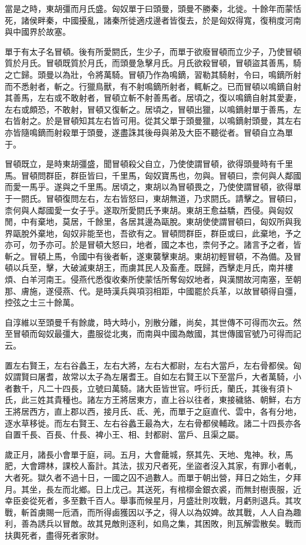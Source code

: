 當是之時，東胡彊而月氏盛。匈奴單于曰頭曼，頭曼不勝秦，北徙。十餘年而蒙恬死，諸侯畔秦，中國擾亂，諸秦所徙適戍邊者皆復去，於是匈奴得寬，復稍度河南與中國界於故塞。

單于有太子名冒頓。後有所愛閼氏，生少子，而單于欲廢冒頓而立少子，乃使冒頓質於月氏。冒頓既質於月氏，而頭曼急擊月氏。月氏欲殺冒頓，冒頓盜其善馬，騎之亡歸。頭曼以為壯，令將萬騎。冒頓乃作為鳴鏑，習勒其騎射，令曰，鳴鏑所射而不悉射者，斬之。行獵鳥獸，有不射鳴鏑所射者，輒斬之。已而冒頓以鳴鏑自射其善馬，左右或不敢射者，冒頓立斬不射善馬者。居頃之，復以鳴鏑自射其愛妻，左右或頗恐，不敢射，冒頓又復斬之。居頃之，冒頓出獵，以鳴鏑射單于善馬，左右皆射之。於是冒頓知其左右皆可用。從其父單于頭曼獵，以鳴鏑射頭曼，其左右亦皆隨鳴鏑而射殺單于頭曼，遂盡誅其後母與弟及大臣不聽從者。冒頓自立為單于。

冒頓既立，是時東胡彊盛，聞冒頓殺父自立，乃使使謂冒頓，欲得頭曼時有千里馬。冒頓問群臣，群臣皆曰，千里馬，匈奴寶馬也，勿與。冒頓曰，柰何與人鄰國而愛一馬乎。遂與之千里馬。居頃之，東胡以為冒頓畏之，乃使使謂冒頓，欲得單于一閼氏。冒頓復問左右，左右皆怒曰，東胡無道，乃求閼氏。請擊之。冒頓曰，柰何與人鄰國愛一女子乎。遂取所愛閼氏予東胡。東胡王愈益驕，西侵。與匈奴閒，中有棄地，莫居，千餘里，各居其邊為甌脫。東胡使使謂冒頓曰，匈奴所與我界甌脫外棄地，匈奴非能至也，吾欲有之。冒頓問群臣，群臣或曰，此棄地，予之亦可，勿予亦可。於是冒頓大怒曰，地者，國之本也，柰何予之。諸言予之者，皆斬之。冒頓上馬，令國中有後者斬，遂東襲擊東胡。東胡初輕冒頓，不為備。及冒頓以兵至，擊，大破滅東胡王，而虜其民人及畜產。既歸，西擊走月氏，南并樓煩、白羊河南王。侵燕代悉復收秦所使蒙恬所奪匈奴地者，與漢關故河南塞，至朝那、膚施，遂侵燕、代。是時漢兵與項羽相距，中國罷於兵革，以故冒頓得自彊，控弦之士三十餘萬。

自淳維以至頭曼千有餘歲，時大時小，別散分離，尚矣，其世傳不可得而次云。然至冒頓而匈奴最彊大，盡服從北夷，而南與中國為敵國，其世傳國官號乃可得而記云。

置左右賢王，左右谷蠡王，左右大將，左右大都尉，左右大當戶，左右骨都侯。匈奴謂賢曰屠耆，故常以太子為左屠耆王。自如左右賢王以下至當戶，大者萬騎，小者數千，凡二十四長，立號曰萬騎。諸大臣皆世官。呼衍氏，蘭氏，其後有須卜氏，此三姓其貴種也。諸左方王將居東方，直上谷以往者，東接穢貉、朝鮮，右方王將居西方，直上郡以西，接月氏、氐、羌，而單于之庭直代、雲中，各有分地，逐水草移徙。而左右賢王、左右谷蠡王最為大，左右骨都侯輔政。諸二十四長亦各自置千長、百長、什長、裨小王、相、封都尉、當戶、且渠之屬。

歲正月，諸長小會單于庭，祠。五月，大會蘢城，祭其先、天地、鬼神。秋，馬肥，大會蹛林，課校人畜計。其法，拔刃尺者死，坐盜者沒入其家，有罪小者軋，大者死。獄久者不過十日，一國之囚不過數人。而單于朝出營，拜日之始生，夕拜月。其坐，長左而北鄉。日上戊己。其送死，有棺槨金銀衣裘，而無封樹喪服，近幸臣妾從死者，多至數千百人。舉事而候星月，月盛壯則攻戰，月虧則退兵。其攻戰，斬首虜賜一卮酒，而所得鹵獲因以予之，得人以為奴婢。故其戰，人人自為趣利，善為誘兵以冒敵。故其見敵則逐利，如鳥之集，其困敗，則瓦解雲散矣。戰而扶輿死者，盡得死者家財。

